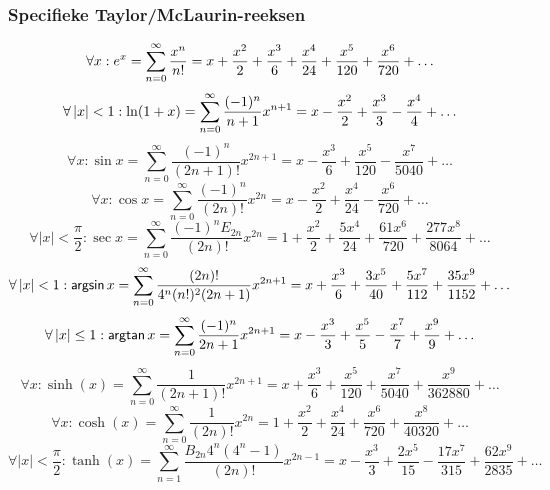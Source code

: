   \subsubsection{Specifieke Taylor/McLaurin-reeksen}
  \label{sec:FreqBenadReeks}
    \[
      \forall x :
      e^{x} = \sum^{\infty}_{n=0} \frac{x^n}{n!}
      = x + \frac{x^2}{2} + \frac{x^3}{6} + \frac{x^4}{24} + \frac{x^5}{120} + \frac{x^6}{720} + \ldots
    \]
    \[
      \forall \left| x \right| < 1 :
      \ln(1+x) = \sum^{\infty}_{n=0} \frac{(-1)^n}{n+1} x^{n+1}
      = x-\frac{x^2}{2}+\frac{x^3}{3}-\frac{x^4}{4}+ \ldots
    \]
    \[
      \forall x :
      \sin x = \sum^{\infty}_{n=0} \frac{(-1)^n}{(2n+1)!} x^{2n+1} 
      = x - \frac{x^3}{6} + \frac{x^5}{120} - \frac{x^7}{5040} + \ldots
    \]
    \[
      \forall x :
      \cos x = \sum^{\infty}_{n=0} \frac{(-1)^n}{(2n)!} x^{2n} 
      = x - \frac{x^2}{2} + \frac{x^4}{24} - \frac{x^6}{720} + \ldots
    \]
    \[
      \forall \left| x \right| < \frac{\pi}{2} :
      \sec x = \sum^{\infty}_{n=0} \frac{(-1)^n E_{2n}}{(2n)!} x^{2n}
      = 1 + \frac{x^2}{2}+\frac{5x^4}{24}+\frac{61x^6}{720}+\frac{277x^8}{8064} + \ldots
    \]
    \[
      \forall \left| x \right| < 1 :
      \mbox{\textsf{argsin}}\, x = \sum^{\infty}_{n=0} \frac{(2n)!}{4^n (n!)^2 (2n+1)} x^{2n+1}
      = x + \frac{x^3}{6} + \frac{3x^5}{40} + \frac{5x^7}{112} + \frac{35x^9}{1152} + \ldots
    \]
    \[
      \forall \left| x \right| \leq 1 :
      \mbox{\textsf{argtan}}\, x = \sum^{\infty}_{n=0} \frac{(-1)^n}{2n+1} x^{2n+1}
      = x - \frac{x^3}{3} + \frac{x^5}{5} - \frac{x^7}{7} + \frac{x^9}{9} + \ldots
    \]
    \[
      \forall x :
      \sinh \left(x\right) = \sum^{\infty}_{n=0} \frac{1}{(2n+1)!} x^{2n+1}
      = x + \frac{x^3}{6} + \frac{x^5}{120} + \frac{x^7}{5040} + \frac{x^9}{362880} + \ldots
    \]
    \[
      \forall x :
      \cosh \left(x\right) = \sum^{\infty}_{n=0} \frac{1}{(2n)!} x^{2n}
      = 1 + \frac{x^2}{2} + \frac{x^4}{24} + \frac{x^6}{720} + \frac{x^8}{40320} + \ldots
    \]
    \[
      \forall \left|x\right| < \frac{\pi}{2} :
      \tanh\left(x\right) = \sum^{\infty}_{n=1} \frac{B_{2n} 4^n (4^n-1)}{(2n)!} x^{2n-1}
      = x - \frac{x^3}{3} + \frac{2x^5}{15}- \frac{17x^7}{315}+ \frac{62x^9}{2835} + \ldots
    \]